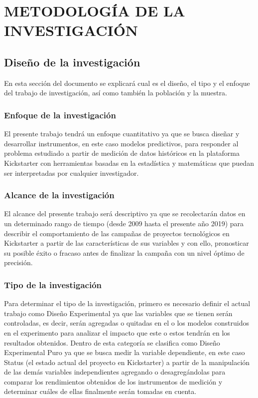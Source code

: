 \chapter{METODOLOGÍA DE LA INVESTIGACIÓN}
\section{Diseño de la investigación}
En esta sección del documento se explicará cual es el diseño, el tipo y el enfoque del trabajo de
investigación, así como también la población y la muestra. 
\subsection{Enfoque de la investigación}
El presente trabajo tendrá un enfoque cuantitativo ya que se busca diseñar y desarrollar instrumentos, en este caso modelos predictivos, para responder al problema estudiado a partir de medición de datos históricos en la plataforma Kickstarter con herramientas basadas en la estadística y matemáticas que puedan ser interpretadas por cualquier investigador. 

\subsection{Alcance de la investigación}
El alcance del presente trabajo será descriptivo ya que se recolectarán datos en un determinado rango de tiempo (desde 2009 hasta el presente año 2019) para describir el comportamiento de las campañas de proyectos tecnológicos en Kickstarter a partir de las características de sus variables y con ello, pronosticar su posible éxito o fracaso antes de finalizar la campaña con un nivel óptimo de precisión.

\subsection{Tipo de la investigación}
Para determinar el tipo de la investigación, primero es necesario definir el actual trabajo como Diseño Experimental ya que las variables que se tienen serán controladas, es decir, serán agregadas o quitadas en el o los modelos construidos en el experimento para analizar el impacto que este o estos tendrán en los resultados obtenidos. Dentro de esta categoría se clasifica como Diseño Experimental Puro ya que se busca medir la variable dependiente, en este caso Status (el estado actual del proyecto en Kickstarter) a partir de la manipulación de las demás variables independientes agregando o desagregándolas para comparar los rendimientos obtenidos de los instrumentos de medición y determinar cuáles de ellas finalmente serán tomadas en cuenta.

